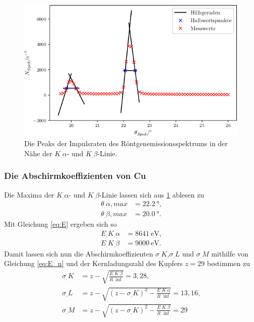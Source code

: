 \begin{figure}
\centering
\includegraphics[width=\linewidth-70pt,height=\textheight-70pt,keepaspectratio]{content/images/PeakSpektrum.png}
\caption{Die Peaks der Impulsraten des Röntgenemissionsspektrums in der Nähe der $K_.{\alpha}$- und $K_.{\beta}$-Linie.}
\label{fig:Peak}
\end{figure}

\subsubsection{Die Abschirmkoeffizienten von Cu}

Die Maxima der $K_.{\alpha}$- und $K_.{\beta}$-Linie lassen sich aus \ref{fig:Peak} ablesen zu
\begin{align*}
\theta_.{\alpha,max}&=\SI{22,2}{\degree}\text{,}\\
\theta_.{\beta,max}&=\SI{20,0}{\degree}\text{.}
\end{align*}
Mit Gleichung \eqref{eq:E} ergeben sich so
\begin{align*}
E_.{K_.{\alpha}}&=\SI{8641}{\eV}\text{,}\\
E_.{K_.{\beta}}&=\SI{9000}{\eV}\text{.}
\end{align*}
Damit lassen sich nun die Abschirmkoeffizienten $\sigma_.K$,$\sigma_.L$ und $\sigma_.M$ mithilfe von Gleichung \eqref{eq:E_n} und der Kernladungszahl des Kupfers $z=29$ bestimmen zu
\begin{align*}
\sigma_.K&=z-\sqrt{\frac{E_.{K_.{\beta}}}{R_.{\inf}}}=3,28\text{,}\\
\sigma_.L&=z-\sqrt{\left(z-\sigma_.K\right)^2-\frac{E_.{K_.{\alpha}}}{R_.{\inf}}}=13,16\text{,}\\
\sigma_.M&=z-\sqrt{\left(z-\sigma_.K\right)^2-\frac{E_.{K_.{\beta}}}{R_.{\inf}}}=29
\end{align*}

